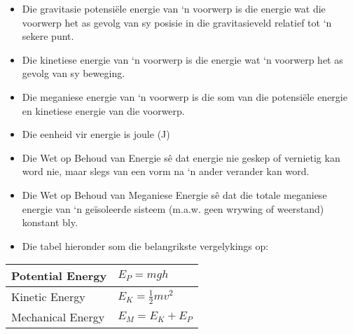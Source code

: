             \nopagebreak
      \label{m38786*id70947}\begin{itemize}[noitemsep]
            \label{m38786*uid111}\item Die gravitasie potensiële energie van ‘n voorwerp is die energie wat die voorwerp het as gevolg van sy posisie in die gravitasieveld relatief tot ‘n sekere punt.
\label{m38786*uid112}\item Die kinetiese energie van ‘n voorwerp is die energie wat ‘n voorwerp het as gevolg van sy beweging.
\label{m38786*uid113}\item Die meganiese energie van ‘n voorwerp is die som van die potensiële energie en kinetiese energie van die voorwerp.
\label{m38786*uid114}\item Die eenheid vir energie is joule (J)
\label{m38786*uid115}\item Die Wet op Behoud van Energie sê dat energie nie geskep of vernietig kan word nie, maar slegs van een vorm na ‘n ander verander kan word.
\label{m38786*uid116}\item Die Wet op Behoud van Meganiese Energie sê dat die totale meganiese energie van ‘n geïsoleerde sisteem (m.a.w. geen wrywing of weerstand) konstant bly.
\label{m38786*uid117}\item Die tabel hieronder som die belangrikste vergelykings op:
\end{itemize}
          \begin{table}[H]
        \begin{center}
      \label{m38786*id71092}
    \noindent
      \begin{tabular}{|l|l|}\hline
        Potential Energy &
                ${E}_{P}=mgh$
             \\ \hline
        Kinetic Energy &
                ${E}_{K}=\frac{1}{2}m{v}^{2}$
              \\ \hline
        Mechanical Energy &
                ${E}_{M}={E}_{K}+{E}_{P}$
            \\ \hline
    \end{tabular}
      \end{center}
\end{table}
    \par
